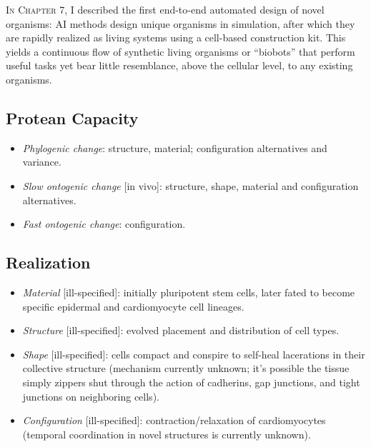 \textsc{In Chapter 7,}
I described the first end-to-end automated design of novel organisms: AI methods design unique organisms in simulation, after which they are rapidly realized as living systems using a cell-based construction kit. 
This yields a continuous flow of synthetic living organisms or ``biobots'' that perform useful tasks yet bear little resemblance, above the cellular level, to any existing organisms. 



\subsection{Protean Capacity}

\begin{itemize}
    \item \textit{Phylogenic change}: structure, material; configuration alternatives and variance.
    \item \textit{Slow ontogenic change} [in vivo]: structure, shape, material and configuration alternatives.
    \item \textit{Fast ontogenic change}: configuration.
\end{itemize}


\subsection{Realization}

\begin{itemize}
    \item \textit{Material} [ill-specified]: initially pluripotent stem cells, later fated to become specific epidermal and cardiomyocyte cell lineages.
    \item \textit{Structure} [ill-specified]: evolved placement and distribution of cell types.
    \item \textit{Shape} [ill-specified]: cells compact and conspire to self-heal lacerations in their collective structure (mechanism currently unknown; it's possible the tissue simply zippers shut through the action of cadherins, gap junctions, and tight junctions on neighboring cells).
    
    \item \textit{Configuration} [ill-specified]: contraction/relaxation of cardiomyocytes (temporal coordination in novel structures is currently unknown).
\end{itemize}


